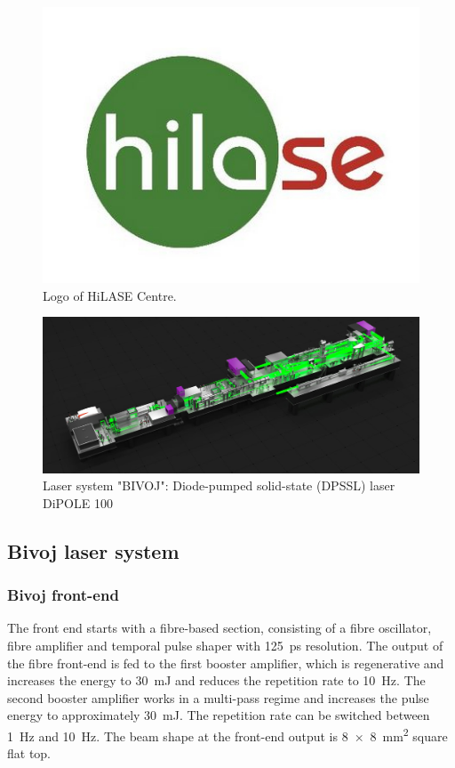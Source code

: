 \begin{figure}[h]
    \centering
    \includegraphics[width=0.6\linewidth]{img/hilase.jpg}
    \caption{Logo of HiLASE Centre.}
    \label{fig:lspconfiguration}
\end{figure}

\begin{figure}[h]
    \centering
    \includegraphics[width=1.0\linewidth]{img/bivoj.jpg}
    \caption{Laser system "BIVOJ": Diode-pumped solid-state (DPSSL) laser DiPOLE 100}
    \label{fig:bivoj}
\end{figure}

\subsection{Bivoj laser system}

\subsubsection*{Bivoj front-end}

The front end starts with a fibre-based section, consisting
of a fibre oscillator, fibre amplifier and temporal pulse shaper
with \SI{125}{\ps} resolution. The output of the fibre front-end is fed
to the first booster amplifier, which is regenerative and
increases the energy to \SI{30}{\milli\joule} and reduces the repetition rate to \SI{10}{\hertz}. The second booster amplifier works in a multi-pass regime
and increases the pulse energy to approximately \SI{30}{\milli\joule}.
The repetition rate can be switched between \SI{1}{\hertz} and \SI{10}{\hertz}. The
beam shape at the front-end output is \SI{8 x 8}{\mm\squared} square flat top.

